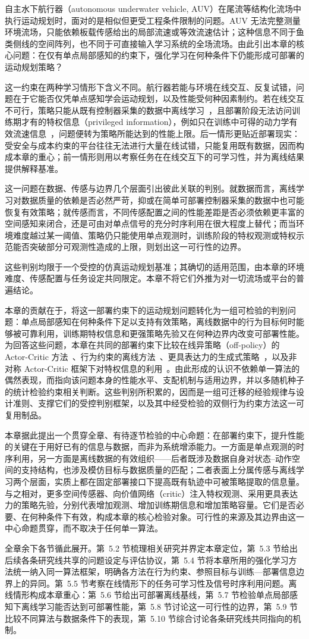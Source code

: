 自主水下航行器（autonomous underwater vehicle, AUV）在尾流等结构化流场中执行运动规划时，面对的是相似但更受工程条件限制的问题。AUV 无法完整测量环境流场，只能依赖板载传感给出的局部流速或等效流速估计；这种信息不同于鱼类侧线的空间阵列，也不同于可直接输入学习系统的全场流场。由此引出本章的核心问题：在仅有单点局部感知的约束下，强化学习在何种条件下仍能形成可部署的运动规划策略？

这一约束在两种学习情形下含义不同。航行器若能与环境在线交互、反复试错，问题在于它能否仅凭单点感知学会运动规划，以及性能受何种因素制约。若在线交互不可行，策略只能从既有控制器采集的数据中离线学习~\citep{levine2020offline}，且部署阶段无法访问训练期才有的特权信息（privileged information），例如只在训练中可得的动力学有效流速信息~\citep{pinto2017asymmetric}，问题便转为策略所能达到的性能上限。后一情形更贴近部署现实：受安全与成本约束的平台往往无法进行大量在线试错，只能复用既有数据，因而构成本章的重心；前一情形则用以考察任务在在线交互下的可学习性，并为离线结果提供解释基准。

这一问题在数据、传感与边界几个层面引出彼此关联的判别。就数据而言，离线学习对数据质量的依赖是否必然严苛，抑或在简单可部署控制器采集的数据中也可能恢复有效策略；就传感而言，不同传感配置之间的性能差距是否必须依赖更丰富的空间感知来闭合，还是可由对单点信号的充分时序利用在很大程度上替代；而当环境难度越过某一阈值、策略仍只能使用单点观测时，训练阶段的特权观测或特权示范能否突破部分可观测性造成的上限，则划出这一可行性的边界。

这些判别均限于一个受控的仿真运动规划基准；其确切的适用范围，由本章的环境难度、传感配置与任务设定共同限定。本章不将它们外推为对一切流场或平台的普遍结论。

本章的贡献在于，将这一部署约束下的运动规划问题转化为一组可检验的判别问题：单点局部感知在何种条件下足以支持有效策略，离线数据中的行为目标何时能够被可靠利用，训练期特权信息和更强策略先验又在何种边界内改变可部署性能。为回答这些问题，本章在共同的部署约束下比较在线异策略（off-policy）的 Actor-Critic 方法~\citep{haarnoja2018sac}、行为约束的离线方法~\citep{fujimoto2021td3bc,tarasov2023rebrac}、更具表达力的生成式策略~\citep{park2025fql}，以及非对称 Actor-Critic 框架下对特权信息的利用~\citep{pinto2017asymmetric}。由此形成的认识不依赖单一算法的偶然表现，而指向该问题本身的性能水平、支配机制与适用边界，并以多随机种子的统计检验约束相关判断。这些判别所积累的，因而是一组可迁移的经验规律与设计准则、支撑它们的受控判别框架，以及其中经受检验的双侧行为约束方法这一可复用制品。

本章据此提出一个贯穿全章、有待逐节检验的中心命题：在部署约束下，提升性能的关键在于用好已有的信息与数据，而非为系统增添能力。一方面是单点观测的时序利用，另一方面是离线数据的有效组织——后者既涉及数据自身对状态–动作空间的支持结构，也涉及模仿目标与数据质量的匹配；二者表面上分属传感与离线学习两个层面，实质上都在固定部署接口下提高既有轨迹中可被策略提取的信息量。与之相对，更多空间传感器、向价值网络（critic）注入特权观测、采用更具表达力的策略先验，分别代表增加观测、增加训练期信息和增加策略容量。它们是否必要、在何种条件下有效，构成本章的核心检验对象。可行性的来源及其边界由这一中心命题贯穿，而不取决于任何单一算法。

全章余下各节循此展开。第~5.2 节梳理相关研究并界定本章定位，第~5.3 节给出后续各条研究线共享的问题设定与评估协议，第~5.4 节将本章所用的强化学习方法统一纳入同一算法框架，明确各方法在行为约束、参照目标与训练—部署信息边界上的异同。第~5.5 节考察在线情形下的任务可学习性及信号时序利用问题。离线情形构成本章重心：第~5.6 节给出可部署离线基线，第~5.7 节检验单点局部感知下离线学习能否达到可部署性能，第~5.8 节讨论这一可行性的边界，第~5.9 节比较不同算法与数据条件下的表现，第~5.10 节综合讨论各条研究线共同指向的机制。

